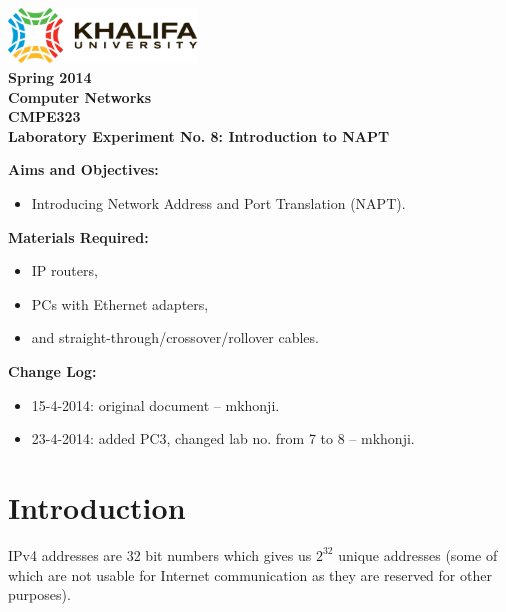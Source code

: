 \documentclass[pdftex,12pt,a4paper]{article}
\begin{document}
    \begin{titlepage}
        \begin{center}
            \includegraphics[width=5cm]{figures/kulogo}\\[1cm]
            {\Large \bfseries
                Spring 2014\\
                Computer Networks\\
                CMPE323\\[1cm]
            }
            {\large \bfseries
                \noindent Laboratory Experiment No. 8: Introduction to NAPT\\[1cm]
            }
        \end{center}

        \noindent \textbf{Aims and Objectives:}
            \begin{itemize}[leftmargin=4cm]
                \item Introducing Network Address and Port Translation (NAPT).
            \end{itemize}
            \vspace{0.5cm}

        \noindent \textbf{Materials Required:}
            \begin{itemize}[leftmargin=4cm]
                \item IP routers,
                \item PCs with Ethernet adapters,
                \item and straight-through/crossover/rollover cables.
            \end{itemize}
            \vspace{0.5cm}

        \noindent \textbf{Change Log:}
            \begin{itemize}[leftmargin=4cm]
                \item 15-4-2014: original document -- mkhonji.
                \item 23-4-2014: added PC3, changed lab no. from 7 to 8 -- mkhonji.
            \end{itemize}
    \end{titlepage}
    \newpage

    \section{Introduction}
        IPv4 addresses are 32 bit numbers which gives us $2^{32}$ unique
        addresses (some of which are not usable for Internet communication as
        they are reserved for other purposes).
\end{document}
